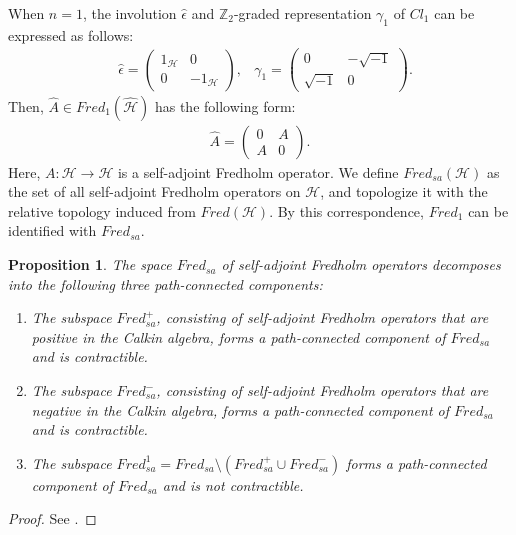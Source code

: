 \documentclass{amsart}
\newtheorem{prop}[thm]{Proposition}
\theoremstyle{definition}
\theoremstyle{remark}
\begin{document}
When $n=1$, the involution $\hat{\epsilon}$ and $\mathbb{Z}_2$-graded representation $\gamma_1$ of $Cl_1$ can be expressed as follows:
\begin{align*}
&\hat{\epsilon}=
\begin{pmatrix}
1_{\mathcal{H}} & 0 \\
0 & -1_{\mathcal{H}}
\end{pmatrix},
&\gamma_1=
\begin{pmatrix}
0 & -\sqrt{-1} \\
\sqrt{-1} & 0
\end{pmatrix}.
\end{align*}
Then, $\hat{A} \in Fred_{1}(\hat{\mathcal{H}})$ has the following form:
\begin{align*}
\hat{A}=
\begin{pmatrix}
0 & A\\
A & 0
\end{pmatrix}.
\end{align*}
Here, $A\colon \mathcal{H}\to \mathcal{H}$ is a self-adjoint Fredholm operator. We define $Fred_{sa}(\mathcal{H})$ as the set of all self-adjoint Fredholm operators on $\mathcal{H}$, and topologize it with the relative topology induced from $Fred(\mathcal{H})$. By this correspondence, $Fred_1$ can be identified with $Fred_{sa}$.


\begin{prop}
The space $Fred_{sa}$ of self-adjoint Fredholm operators decomposes into the following three path-connected components:
\begin{enumerate}
\item The subspace $Fred_{sa}^{+}$, consisting of self-adjoint Fredholm operators that are positive in the Calkin algebra, forms a path-connected component of $Fred_{sa}$ and is contractible.
\item The subspace $Fred_{sa}^{-}$, consisting of self-adjoint Fredholm operators that are negative in the Calkin algebra, forms a path-connected component of $Fred_{sa}$ and is contractible.
\item The subspace $Fred_{sa}^1 = Fred_{sa} \setminus (Fred_{sa}^{+} \cup Fred_{sa}^{-})$ forms a path-connected component of $Fred_{sa}$ and is not contractible.
\end{enumerate}
\end{prop}


\begin{proof}
See \cite{A-Si}.
\end{proof}
\end{document}
